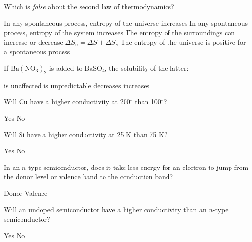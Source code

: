 \documentclass[answers]{exam}
\begin{document}
\begin{multicols}{2}
\begin{questions}
\question Which is \emph{false} about the second law of thermodynamics?

\begin{choices}
  \choice In any spontaneous process, entropy of the universe increases
  \choice In any spontaneous process, entropy of the system increases
  \choice The entropy of the surroundings can increase or decrease
  \choice $\Delta S_u = \Delta S + \Delta S_s$
  \choice The entropy of the universe is positive for a spontaneous process
\end{choices}

\question If $\mathrm{Ba(NO_3)_2}$ is added to $\mathrm{BaSO_4}$, the solubility of the latter:

\begin{choices}
  \choice is unaffected
  \choice is unpredictable
  \choice decreases
  \choice increases
\end{choices}

\question Will Cu have a higher conductivity at 200$^\circ$ than 100$^\circ$?

\begin{oneparchoices}
  \choice Yes
  \CorrectChoice No
\end{oneparchoices}

\question Will Si have a higher conductivity at 25 K than 75 K?

\begin{oneparchoices}
  \choice Yes
  \CorrectChoice No
\end{oneparchoices}

\question In an $n$-type semiconductor, does it take less energy for an electron to jump from the donor level or valence band to the conduction band?

\begin{oneparchoices}
  \CorrectChoice Donor
  \choice Valence
\end{oneparchoices}

\question Will an undoped semiconductor have a higher conductivity than an $n$-type semiconductor?

\begin{oneparchoices}
  \choice Yes
  \CorrectChoice No
\end{oneparchoices}


\end{questions}
\end{multicols}

\end{document}
